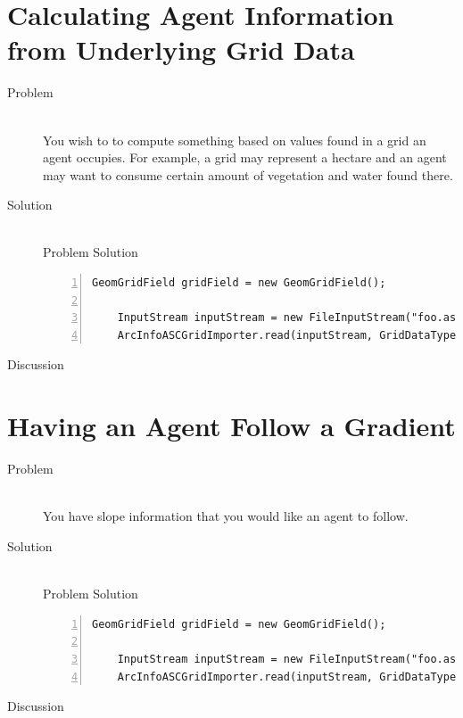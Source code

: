 \documentclass[twoside,10pt]{book}
\begin{document}
\section{Calculating Agent Information from Underlying Grid Data}
\label{sec:gridtoagentdata}

\begin{description}
\item[Problem]~\\
You wish to to compute something based on values found in a grid an
agent occupies.  For example, a grid may represent a hectare and an
agent may want to consume certain amount of vegetation and water found there.

\item[Solution]~\\
Problem Solution
\begin{Verbatim}[frame=lines,framesep=5mm,numbers=left,commandchars=+\[\]]
	GeomGridField gridField = new GeomGridField();
	
	InputStream inputStream = new FileInputStream("foo.asc");
	ArcInfoASCGridImporter.read(inputStream, GridDataType.INTEGER, gridField);
\end{Verbatim}

\item[Discussion ]
\end{description}



\section{Having an Agent Follow a Gradient}
\label{sec:followinggradients}

\begin{description}
\item[Problem]~\\
You have slope information that you would like an agent to follow.

\item[Solution]~\\
Problem Solution
\begin{Verbatim}[frame=lines,framesep=5mm,numbers=left,commandchars=+\[\]]
	GeomGridField gridField = new GeomGridField();
	
	InputStream inputStream = new FileInputStream("foo.asc");
	ArcInfoASCGridImporter.read(inputStream, GridDataType.INTEGER, gridField);
\end{Verbatim}

\item[Discussion ]
\end{description}
\end{document}
